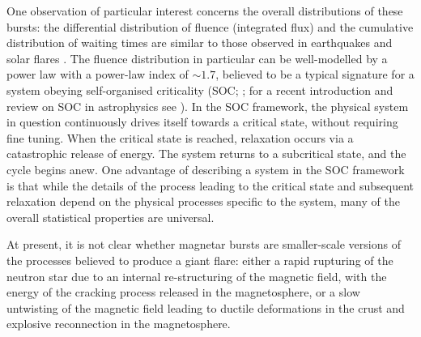 \documentclass[12pt]{emulateapj}
\begin{document}
One observation of particular interest concerns the overall distributions of these bursts: the differential distribution of fluence (integrated flux) and 
the cumulative distribution of waiting times are similar to those observed in earthquakes and solar flares \citep{cheng1996,gogus1999,gogus2000,prieskorn2012}. The fluence distribution
in particular can be well-modelled by a power law with a power-law index of $\sim\!\! 1.7$, believed to be a typical signature for a system obeying 
self-organised criticality (SOC; \citealp{bak1987,bak1988}; for a recent introduction and review on SOC in astrophysics see \citealp{aschwanden2014}). 
In the SOC framework, the physical system in question continuously drives itself towards a critical state,
without requiring fine tuning. When the critical state is reached, relaxation occurs via a catastrophic release of energy. The system returns
to a subcritical state, and the cycle begins anew. %
One advantage of describing a system in the SOC framework is that while the details of the process leading to the critical state and subsequent
relaxation depend on the physical processes specific to the system, many of the overall statistical properties are universal.

At present, it is not clear whether magnetar bursts are smaller-scale versions of the processes believed to produce a giant flare:
either a rapid rupturing of the neutron star due to an internal re-structuring of the magnetic field, with the energy of the cracking process
released in the magnetosphere, or a slow untwisting of the magnetic field leading to ductile deformations in the crust and explosive 
reconnection in the magnetosphere.

\end{document}
